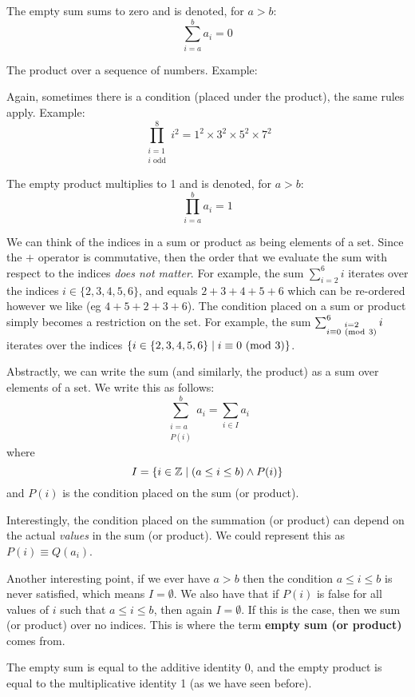 \documentclass[main.tex]{subfiles}
\begin{document}
The empty sum sums to zero and is denoted, for \(a > b\): \[\sum_{i = a}^{b} a_i = 0\]

\begin{defn}
	The product over a sequence of numbers. Example: \[\]
	
	Again, sometimes there is a condition (placed under the product), the same rules apply. Example: \[\prod_{\substack{i = 1 \\ i \text{ odd}}}^{8} i^2 = 1^2 \times 3^2 \times 5^2 \times 7^2\]
\end{defn}

The empty product multiplies to 1 and is denoted, for \(a > b\): \[\prod_{i = a}^{b} a_i = 1\]

\begin{rem}
	We can think of the indices in a sum or product as being elements of a set. Since the \(+\) operator is commutative, then the order that we evaluate the sum with respect to the indices \textit{does not matter}. For example, the sum \(\sum_{i=2}^{6} i\) iterates over the indices \(i \in \{2,3,4,5,6\}\), and equals \(2+3+4+5+6\) which can be re-ordered however we like (eg \(4+5+2+3+6\)). The condition placed on a sum or product simply becomes a restriction on the set. For example, the sum \(\sum_{\substack{i=2 \\ i \equiv 0 \ (\mathrm{mod}\ 3)}}^{6} i\) iterates over the indices \(\{i \in \{2,3,4,5,6\} \mid i \equiv 0 \ (\mathrm{mod}\ 3)\}\).
	
	Abstractly, we can write the sum (and similarly, the product) as a sum over elements of a set. We write this as follows: \[\sum_{\substack{i=a \\ P(i)}}^{b} a_i = \sum_{i \in I} a_i\] where \[I = \{i \in \mathbb{Z} \mid (a \leq i \leq b) \land P(i)\}\] and \(P(i)\) is the condition placed on the sum (or product).
	
	Interestingly, the condition placed on the summation (or product) can depend on the actual \textit{values} in the sum (or product). We could represent this as \(P(i) \equiv Q(a_i)\).
	
	Another interesting point, if we ever have \(a > b\) then the condition \(a \leq i \leq b\) is never satisfied, which means \(I = \emptyset\). We also have that if \(P(i)\) is false for all values of \(i\) such that \(a \leq i \leq b\), then again \(I = \emptyset\). If this is the case, then we sum (or product) over no indices. This is where the term \textbf{empty sum (or product)} comes from.
	
	The empty sum is equal to the additive identity 0, and the empty product is equal to the multiplicative identity 1 (as we have seen before).
\end{rem}
\end{document}

